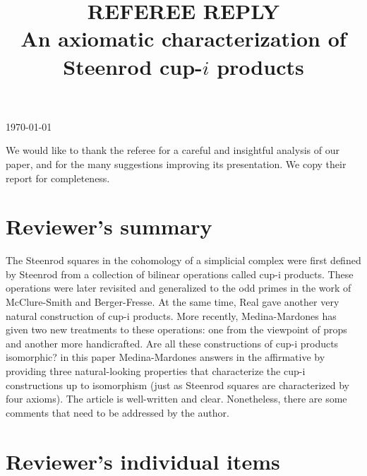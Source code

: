 \documentclass{amsart}
\title[Referee reply]{REFEREE REPLY \\ An axiomatic characterization of Steenrod cup-$i$ products}
\begin{document}
	\noindent\today
	\maketitle

	We would like to thank the referee for a careful and insightful analysis of our paper, and for the many suggestions improving its presentation.
	We copy their report for completeness.

	\section{Reviewer's summary}

	The Steenrod squares in the cohomology of a simplicial complex were first defined by Steenrod from a collection of bilinear operations called cup-i products.
	These operations were later revisited and generalized to the odd primes in the work of McClure-Smith and Berger-Fresse. At the same time, Real gave another	very natural construction of cup-i products. More recently, Medina-Mardones	has given two new treatments to these operations: one from the viewpoint of props and another more handicrafted.
	Are all these constructions of cup-i products isomorphic? in this paper	Medina-Mardones answers in the affirmative by providing three natural-looking
	properties that characterize the cup-i constructions up to isomorphism (just as	Steenrod squares are characterized by four axioms).
	The article is well-written and clear.
	Nonetheless, there are some comments that need to be addressed by the author.

	\section{Reviewer's individual items}
\end{document}
